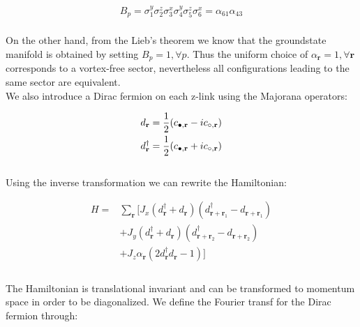\documentclass{article}
\begin{document}
\begin{equation}\label{eq:10}
	\begin{aligned}
		B_p = \sigma^y_1\sigma^z_2\sigma^x_3\sigma^y_4\sigma^z_5\sigma^x_6 = \alpha_{61}\alpha_{43}\\
	\end{aligned}
\end{equation}

\noindent On the other hand, from the Lieb's theorem \cite{Lieb_1994} we know that the groundstate manifold is obtained by setting $B_p = 1, \forall p$. 
Thus the uniform choice of $\alpha_\textbf{r}=1, \forall \textbf{r}$ corresponds to a vortex-free sector, nevertheless all configurations leading to the same sector are equivalent.\\

\noindent We also introduce a Dirac fermion on each z-link using the Majorana operators:

\begin{equation}\label{eq:11}
	\begin{aligned}
		d_\textbf{r} &= \frac{1}{2} (c_{\color{black}\bullet,\textbf{r}} - ic_{\circ,\textbf{r}})\\
		d^\dagger_\textbf{r} &= \frac{1}{2} (c_{\color{black}\bullet,\textbf{r}} + ic_{\circ,\textbf{r}})
	\end{aligned}
\end{equation}\\

\noindent Using the inverse transformation we can rewrite the Hamiltonian:

\begin{equation}\label{eq:12}
	\begin{aligned}
		H= &\sum_{\textbf{r}}[J_x (d^\dagger_{\textbf{r}} + d_{\textbf{r}})(d^\dagger_{\textbf{r}+\textbf{r}_1} - d_{\textbf{r}+\textbf{r}_1}) \\
		&+J_y (d^\dagger_{\textbf{r}} + d_{\textbf{r}})(d^\dagger_{\textbf{r}+\textbf{r}_2} - d_{\textbf{r}+\textbf{r}_2}) \\
		&+J_z \alpha_\textbf{r}(2d^\dagger_{\textbf{r}}d_{\textbf{r}}-1)]\\ 
	\end{aligned}
\end{equation}\\

\noindent The Hamiltonian is translational invariant and can be transformed to momentum space in order to be diagonalized. We define the Fourier transf for the Dirac fermion through:
\end{document}
